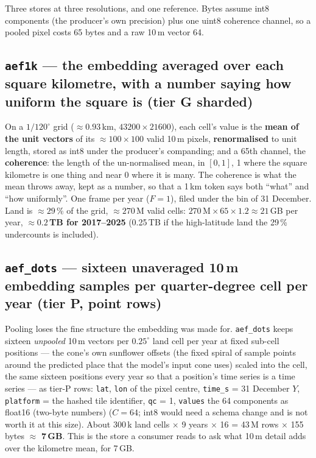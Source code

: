 \documentclass[10pt]{article}
\newcommand{\code}[1]{\texttt{#1}}
\begin{document}
Three stores at three resolutions, and one reference. Bytes assume int8
components (the producer's own precision) plus one uint8 coherence channel,
so a pooled pixel costs 65 bytes and a raw 10\,m vector 64.

\subsection{\code{aef1k} --- the embedding averaged over each square kilometre, with a number saying how uniform the square is (tier G sharded)}\label{sec:aef1k}

On a $1/120^\circ$ grid ($\approx 0.93$\,km, $43200 \times 21600$), each
cell's value is the \textbf{mean of the unit vectors} of its $\approx 100
\times 100$ valid 10\,m pixels, \textbf{renormalised} to unit length, stored
as int8 under the producer's companding; and a 65th channel, the
\textbf{coherence}: the length of the un-normalised mean, in $[0, 1]$, 1
where the square kilometre is one thing and near 0 where it is many. The
coherence is what the mean throws away, kept as a number, so that a 1\,km
token says both ``what'' and ``how uniformly''. One frame per year
($F = 1$), filed under the bin of 31 December. Land is $\approx 29$\,\% of
the grid, $\approx 270$\,M valid cells: $270\,\mathrm{M} \times 65 \times
1.2 \approx 21$\,GB per year, \textbf{$\approx 0.2$\,TB for 2017--2025}
(0.25\,TB if the high-latitude land the 29\,\% undercounts is included).

\subsection{\code{aef\_dots} --- sixteen unaveraged 10\,m embedding samples per quarter-degree cell per year (tier P, point rows)}

Pooling loses the fine structure the embedding was made for. \code{aef\_dots}
keeps sixteen \emph{unpooled} 10\,m vectors per $0.25^\circ$ land cell per
year at fixed sub-cell positions --- the cone's own sunflower offsets (the fixed spiral of sample points around the predicted place that the model's input cone uses) scaled
into the cell, the same sixteen positions every year so that a position's
time series is a time series --- as tier-P rows: \code{lat}, \code{lon} of
the pixel centre, \code{time\_s} = 31 December $Y$, \code{platform} = the
hashed tile identifier, \code{qc} = 1, \code{values} the 64 components as
float16 (two-byte numbers) ($C = 64$; int8 would need a schema change and is not worth it at
this size). About 300\,k land cells $\times$ 9 years $\times$ 16 =
43\,M rows $\times$ 155 bytes $\approx$ \textbf{7\,GB}. This is the store a
consumer reads to ask what 10\,m detail adds over the kilometre mean, for
7\,GB.
\end{document}
